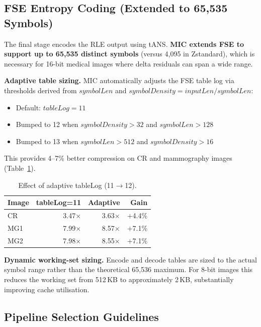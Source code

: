 \documentclass[10pt,twocolumn]{article}
\begin{document}
\subsection{FSE Entropy Coding (Extended to 65,535 Symbols)}

The final stage encodes the RLE output using tANS. \textbf{MIC extends FSE to
support up to 65,535 distinct symbols} (versus 4,095 in Zstandard), which is
necessary for 16-bit medical images where delta residuals can span a wide range.

\textbf{Adaptive table sizing.} MIC automatically adjusts the FSE table log via
thresholds derived from $\textit{symbolLen}$ and $\textit{symbolDensity} =
\textit{inputLen} / \textit{symbolLen}$:
\begin{itemize}
  \item Default: $\textit{tableLog} = 11$
  \item Bumped to 12 when $\textit{symbolDensity} > 32$ and
  $\textit{symbolLen} > 128$
  \item Bumped to 13 when $\textit{symbolLen} > 512$ and
  $\textit{symbolDensity} > 16$
\end{itemize}
This provides 4--7\% better compression on CR and mammography images
(Table~\ref{tab:tablelog}).

\begin{table}[htbp]
\centering
\footnotesize
\setlength{\tabcolsep}{4pt}
\caption{Effect of adaptive tableLog (11$\to$12).}
\label{tab:tablelog}
\begin{tabular}{lrrr}
\toprule
Image & tableLog=11 & Adaptive & Gain \\
\midrule
CR  & 3.47$\times$ & 3.63$\times$ & $+$4.4\% \\
MG1 & 7.99$\times$ & 8.57$\times$ & $+$7.1\% \\
MG2 & 7.98$\times$ & 8.55$\times$ & $+$7.1\% \\
\bottomrule
\end{tabular}
\end{table}

\textbf{Dynamic working-set sizing.} Encode and decode tables are sized to the
actual symbol range rather than the theoretical 65,536 maximum. For 8-bit images
this reduces the working set from 512\,KB to approximately 2\,KB, substantially
improving cache utilisation.

\subsection{Pipeline Selection Guidelines}
\end{document}
